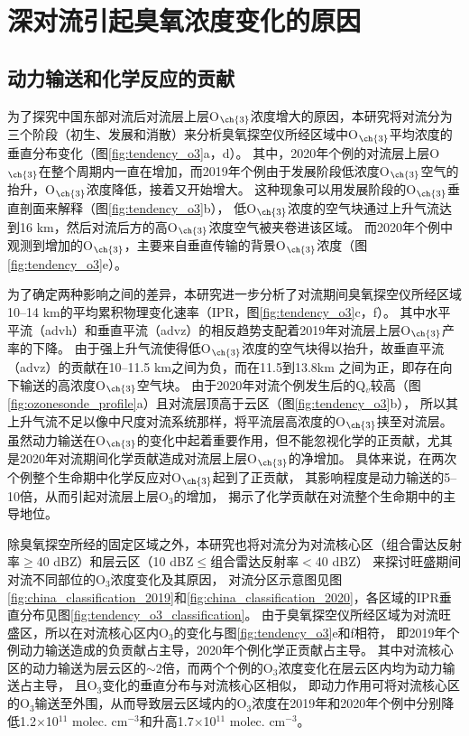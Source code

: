 \section{深对流引起臭氧浓度变化的原因} \label{sec:convec_impacts}

\subsection{动力输送和化学反应的贡献}

为了探究中国东部对流后对流层上层O$_{\ch{3}}$浓度增大的原因，本研究将对流分为三个阶段（初生、发展和消散）来分析臭氧探空仪所经区域中O$_{\ch{3}}$平均浓度的垂直分布变化（图\ref{fig:tendency_o3}a，d）。
其中，2020年个例的对流层上层O$_{\ch{3}}$在整个周期内一直在增加，而2019年个例由于发展阶段低浓度O$_{\ch{3}}$空气的抬升，O$_{\ch{3}}$浓度降低，接着又开始增大。
这种现象可以用发展阶段的O$_{\ch{3}}$垂直剖面来解释（图\ref{fig:tendency_o3}b），
低O$_{\ch{3}}$浓度的空气块通过上升气流达到16 km，然后对流后方的高O$_{\ch{3}}$浓度空气被夹卷进该区域。
而2020年个例中观测到增加的O$_{\ch{3}}$，主要来自垂直传输的背景O$_{\ch{3}}$浓度（图\ref{fig:tendency_o3}e）。

为了确定两种影响之间的差异，本研究进一步分析了对流期间臭氧探空仪所经区域10--14 km的平均累积物理变化速率（IPR，图\ref{fig:tendency_o3}c，f）。
其中水平平流（advh）和垂直平流（advz）的相反趋势支配着2019年对流层上层O$_{\ch{3}}$产率的下降。
由于强上升气流使得低O$_{\ch{3}}$浓度的空气块得以抬升，故垂直平流（advz）的贡献在10--11.5 km之间为负，而在11.5到13.8km 之间为正，即存在向下输送的高浓度O$_{\ch{3}}$空气块。
由于2020年对流个例发生后的Q$_v$较高（图\ref{fig:ozonesonde_profile}a）且对流层顶高于云区（图\ref{fig:tendency_o3}b），
所以其上升气流不足以像中尺度对流系统那样，将平流层高浓度的O$_{\ch{3}}$挟至对流层\citep{Phoenix.2020}。
虽然动力输送在O$_{\ch{3}}$的变化中起着重要作用，但不能忽视化学的正贡献，尤其是2020年对流期间化学贡献造成对流层上层O$_{\ch{3}}$的净增加。
具体来说，在两次个例整个生命期中化学反应对O$_{\ch{3}}$起到了正贡献，
其影响程度是动力输送的5--10倍，从而引起对流层上层O$_3$的增加，
揭示了化学贡献在对流整个生命期中的主导地位。

除臭氧探空所经的固定区域之外，本研究也将对流分为对流核心区（组合雷达反射率$\geq$40 dBZ）和层云区（10 dBZ$\leq$组合雷达反射率$<$40 dBZ）
来探讨旺盛期间对流不同部位的O$_3$浓度变化及其原因，
对流分区示意图见图\ref{fig:china_classification_2019}和\ref{fig:china_classification_2020}，各区域的IPR垂直分布见图\ref{fig:tendency_o3_classification}。
由于臭氧探空仪所经区域为对流旺盛区，所以在对流核心区内O$_3$的变化与图\ref{fig:tendency_o3}e和f相符，
即2019年个例动力输送造成的负贡献占主导，2020年个例化学正贡献占主导。
其中对流核心区的动力输送为层云区的$\sim$2倍，而两个个例的O$_3$浓度变化在层云区内均为动力输送占主导，
且O$_3$变化的垂直分布与对流核心区相似，
即动力作用可将对流核心区的O$_3$输送至外围，从而导致层云区域内的O$_3$浓度在2019年和2020年个例中分别降低1.2$\times$10$^{11}$ molec. cm$^{-3}$和升高1.7$\times$10$^{11}$ molec. cm$^{-3}$。


